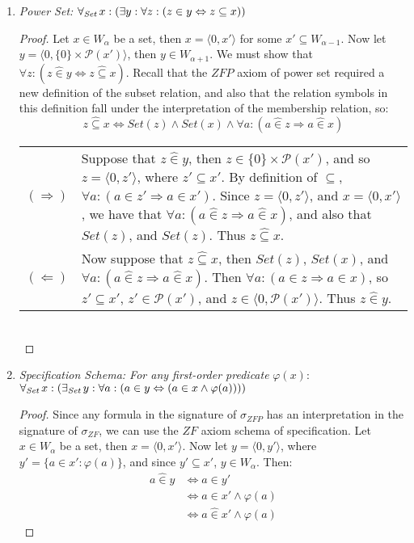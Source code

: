 \documentclass[11pt]{report}
\newcommand{\all}[1]{\forall_{\mathit{#1}}\hspace{0.5mm}}
\newcommand{\ex}[1]{\exists_{\mathit{#1}}\hspace{0.5mm}}
\newcommand{\pair}[2]{\langle #1,#2 \rangle}
\newcommand{\zin}{\mathrel{\widehat{\in}}}
\theoremstyle{definition}
\theoremstyle{theorem}
\theoremstyle{lemma}
\begin{document}
\begin{enumerate}[resume=axiomlist, label=\Roman*.]
\item \textit{Power Set:} $\all{Set}x:(\exists y:\forall z:(z\in y \Leftrightarrow z\subseteq x))$
\begin{proof}
  Let $x\in W_\alpha$ be a set, then $x=\pair{0}{x'}$ for some $x'\subseteq W_{\alpha-1}$.
  Now let $y=\pair{0}{\{0\}\times\mathcal{P}(x')}$, then $y\in W_{\alpha+1}$.
  We must show that $\forall z: (z\zin y \Leftrightarrow z\mathrel{\widehat\subseteq} x)$.
  Recall that the $\mathit{ZFP}$ axiom of power set required a new definition of the subset relation, and also that the relation symbols in this definition fall under the interpretation of the membership relation, so:
    $$z\mathrel{\widehat\subseteq} x \iff \mathit{Set}(z)\wedge\mathit{Set}(x)
                        \wedge \forall a: (a\zin z \Rightarrow a\zin x)$$
\begin{tabular}{p{7mm} p{133mm}}
  $(\Rightarrow)$\rule{0pt}{5mm} &
  Suppose that $z\zin y$, then $z\in\{0\}\times\mathcal{P}(x')$, and so $z=\pair{0}{z'}$, where $z'\subseteq x'$.
  By definition of $\subseteq$, $\forall a:(a\in z' \Rightarrow a\in x')$.
  Since $z=\pair{0}{z'}$, and $x=\pair{0}{x'}$, we have that $\forall a: (a\zin z \Rightarrow a\zin x)$, and also that $\mathit{Set}(z)$, and $\mathit{Set}(z)$. Thus $z\mathrel{\widehat\subseteq}x$.
  \\
  $(\Leftarrow)$ &\rule{0pt}{5mm}
  Now suppose that $z\mathrel{\widehat\subseteq}x$, then $\mathit{Set}(z)$, $\mathit{Set}(x)$, and $\forall a:(a\zin z\Rightarrow a\zin x)$.
  Then $\forall a:(a\in z\Rightarrow a\in x)$, so $z'\subseteq x'$, $z'\in \mathcal{P}(x')$, and $z\in\pair{0}{\mathcal{P}(x')}$.
  Thus $z\zin y$.
\end{tabular}\\
\end{proof}

\item \textit{Specification Schema: For any first-order predicate} $\varphi(x)$: \\
$\all{Set}x: (\ex{Set}y: \forall a:
                              (a\in y \Leftrightarrow (a\in x \wedge \varphi(a))))$
\begin{proof}
Since any formula in the signature of $\sigma_{\mathit{ZFP}}$ has an interpretation in the signature of $\sigma_{\mathit{ZF}}$, we can use the $\mathit{ZF}$ axiom schema of specification.
Let $x\in W_\alpha$ be a set, then $x=\pair{0}{x'}$.
Now let $y=\pair{0}{y'}$, where $y'=\{a\in x' : \varphi(a)\}$, and since $y'\subseteq x'$, $y\in W_\alpha$. Then:
\begin{align*}
  a\zin y &\iff a\in y'\\
          &\iff a\in x'\wedge \varphi(a)\\
          &\iff a\zin x' \wedge \varphi(a)
\end{align*}
\end{proof}
\end{enumerate}
\end{document}
